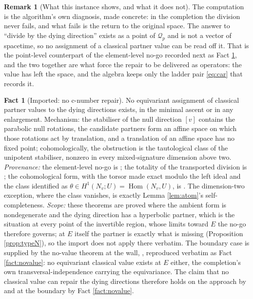 \documentclass[11pt]{article}
\theoremstyle{definition}
\newtheorem{remark}[theorem]{Remark}
\newtheorem{fact}[theorem]{Fact}
\begin{document}
\begin{remark}[What this instance shows, and what it does not]\label{rem:liftreading}
The computation is the algorithm's own diagnosis, made concrete: in the completion the division never fails, and what fails is the return to the original space. The answer to ``divide by the dying direction'' exists as a point of $\mathcal{Q}_p$ and is not a vector of spacetime, so no assignment of a classical partner value can be read off it. That is the point-level counterpart of the element-level no-go recorded next as Fact \ref{thm:nocnumber}, and the two together are what force the repair to be delivered as operators: the value has left the space, and the algebra keeps only the ladder pair \eqref{eq:car} that records it.
\end{remark}

\begin{fact}[Imported: no c-number repair]\label{thm:nocnumber}
No equivariant assignment of classical partner values to the dying directions exists, in the minimal ascent or in any enlargement. Mechanism: the stabiliser of the null direction $[v]$ contains the parabolic null rotations, the candidate partners form an affine space on which those rotations act by translation, and a translation of an affine space has no fixed point; cohomologically, the obstruction is the tautological class of the unipotent stabiliser, nonzero in every mixed-signature dimension above two. \emph{Provenance:} the element-level no-go is \cite[Thm.~4.2]{ButlerT1}; the totality of the transported division is \cite[Thm.~4.10]{ButlerT1}; the cohomological form, with the torsor made exact modulo the left ideal and the class identified as $\theta \in H^1(N_v; U) = \operatorname{Hom}(N_v, U)$, is \cite[Thm.~4.8]{ButlerT1}. The dimension-two exception, where the class vanishes, is exactly Lemma \ref{lem:atom}'s self-completeness. \emph{Scope:} these theorems are proved where the ambient form is nondegenerate and the dying direction has a hyperbolic partner, which is the situation at every point of the invertible region, whose limits toward $E$ the no-go therefore governs; at $E$ itself the partner is exactly what is missing (Proposition \ref{prop:typeN}), so the import does not apply there verbatim. The boundary case is supplied by the no-value theorem at the wall, \cite[Thm.~10.4]{ButlerT4}, reproduced verbatim as Fact \ref{fact:novalue}: no equivariant classical value exists at $E$ either, the completion's own transversal-independence carrying the equivariance. The claim that no classical value can repair the dying directions therefore holds on the approach by \cite[Thm.~4.2]{ButlerT1} and at the boundary by Fact \ref{fact:novalue}.
\end{fact}
\end{document}
